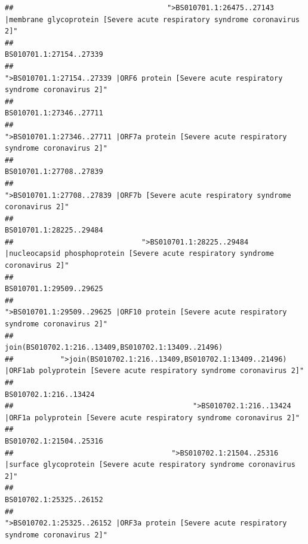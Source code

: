 \documentclass[
]{article}
\begin{document}
\begin{verbatim}
##                                    ">BS010701.1:26475..27143 |membrane glycoprotein [Severe acute respiratory syndrome coronavirus 2]" 
##                                                                                                                BS010701.1:27154..27339 
##                                             ">BS010701.1:27154..27339 |ORF6 protein [Severe acute respiratory syndrome coronavirus 2]" 
##                                                                                                                BS010701.1:27346..27711 
##                                            ">BS010701.1:27346..27711 |ORF7a protein [Severe acute respiratory syndrome coronavirus 2]" 
##                                                                                                                BS010701.1:27708..27839 
##                                                    ">BS010701.1:27708..27839 |ORF7b [Severe acute respiratory syndrome coronavirus 2]" 
##                                                                                                                BS010701.1:28225..29484 
##                              ">BS010701.1:28225..29484 |nucleocapsid phosphoprotein [Severe acute respiratory syndrome coronavirus 2]" 
##                                                                                                                BS010701.1:29509..29625 
##                                            ">BS010701.1:29509..29625 |ORF10 protein [Severe acute respiratory syndrome coronavirus 2]" 
##                                                                                    join(BS010702.1:216..13409,BS010702.1:13409..21496) 
##           ">join(BS010702.1:216..13409,BS010702.1:13409..21496) |ORF1ab polyprotein [Severe acute respiratory syndrome coronavirus 2]" 
##                                                                                                                  BS010702.1:216..13424 
##                                          ">BS010702.1:216..13424 |ORF1a polyprotein [Severe acute respiratory syndrome coronavirus 2]" 
##                                                                                                                BS010702.1:21504..25316 
##                                     ">BS010702.1:21504..25316 |surface glycoprotein [Severe acute respiratory syndrome coronavirus 2]" 
##                                                                                                                BS010702.1:25325..26152 
##                                            ">BS010702.1:25325..26152 |ORF3a protein [Severe acute respiratory syndrome coronavirus 2]" 

\end{verbatim}
\end{document}
